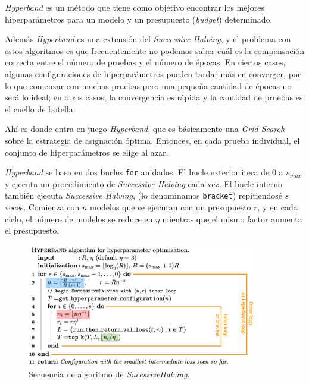 \documentclass[a4paper,12pt]{article}
\begin{document}
\textit{Hyperband} es un método que tiene como objetivo encontrar los mejores hiperparámetros para un modelo y un presupuesto (\textit{budget}) determinado. 

Además \textit{Hyperband} es una extensión del \textit{Successive Halving}, y el problema con estos algoritmos es que frecuentemente no podemos saber cuál es la compensación correcta entre el número de pruebas y el número de épocas. En ciertos casos, algunas configuraciones de hiperparámetros pueden tardar más en converger, por lo que comenzar con muchas pruebas pero una pequeña cantidad de épocas no será lo ideal; en otros casos, la convergencia es rápida y la cantidad de pruebas es el cuello de botella. \citep{Rosenberg2020Aug}

Ahí es donde entra en juego \textit{Hyperband}, que es básicamente una \textit{Grid Search} sobre la estrategia de asignación óptima. Entonces, en cada prueba individual, el conjunto de hiperparámetros se elige al azar.

\textit{Hyperband} se basa en dos bucles \texttt{for} anidados. El bucle exterior itera de $0$ a $s_{max}$ y ejecuta un procedimiento de \textit{Successive Halving} cada vez. El bucle interno también ejecuta \textit{Successive Halving}, (lo denominamos \texttt{bracket}) repitiendosé $s$ veces. Comienza con $n$ modelos que se ejecutan con un presupuesto $r$, y en cada ciclo, el número de modelos se reduce en $\eta$ mientras que el mismo factor aumenta el presupuesto. \citep{Abraham2021Feb}

\begin{figure}[H]
	\begin{center}
		\includegraphics[width=0.9\textwidth]{hyperband_algo.png}
		\caption{Secuencia de algoritmo de \textit{SucessiveHalving}.}
		\label{fig:hyper_algo}
	\end{center}
\end{figure}
\end{document}
